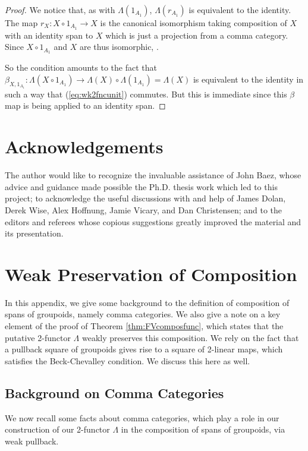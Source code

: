 \documentclass[10pt]{amsart}
\numberwithin{theorem}{subsection}
\newcommand{\ra}{\mathop{\rightarrow}}
\newcommand{\FV}{\Lambda}
\begin{document}
\begin{proof}
We notice that, as with $\FV(1_{A_1})$, $\FV(r_{A_1})$ is equivalent to the
identity.  The map $r_X : X \circ 1_{A_1} \ra X$ is the canonical
isomorphism taking composition of $X$ with an identity span to $X$
which is just a projection from a comma category.  Since $X \circ 1_{A_1}$
and $X$ are thus isomorphic, .

So the condition amounts to the fact that $\beta_{X,1_{A_1}} : \FV(X
\circ 1_{A_1}) \ra \FV(X) \circ \FV(1_{A_1}) = \FV(X) $ is equivalent
to the identity in such a way that (\ref{eq:wk2fncunit}) commutes.
But this is immediate since this $\beta$ map is being applied to an
identity span.
\end{proof}

\section{Acknowledgements}

The author would like to recognize the invaluable assistance of John
Baez, whose advice and guidance made possible the Ph.D. thesis work
which led to this project; to acknowledge the useful discussions with
and help of James Dolan, Derek Wise, Alex Hoffnung, Jamie Vicary, and
Dan Christensen; and to the editors and referees whose copious
suggestions greatly improved the material and its presentation.

\appendix

\section{Weak Preservation of Composition}\label{ax:composproof}

In this appendix, we give some background to the definition of composition of spans of groupoids, namely comma categories.  We also give a note on a key element of the proof of Theorem
\ref{thm:FVcomposfunc}, which states that the putative 2-functor $\FV$
weakly preserves this composition.  We rely on the fact that a pullback
square of groupoids gives rise to a square of 2-linear maps, which
satisfies the Beck-Chevalley condition.  We discuss this here as well.

\subsection{Background on Comma Categories}\label{sec:commacat}

We now recall some facts about comma categories, which play a role in
our construction of our 2-functor $\FV$ in the composition of spans of
groupoids, via weak pullback.
\end{document}
